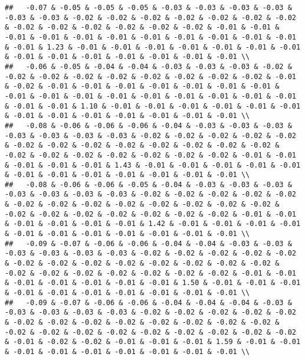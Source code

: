 \documentclass[
]{article}
\begin{document}
\begin{verbatim}
##   -0.07 & -0.05 & -0.05 & -0.05 & -0.03 & -0.03 & -0.03 & -0.03 & -0.03 & -0.03 & -0.02 & -0.02 & -0.02 & -0.02 & -0.02 & -0.02 & -0.02 & -0.02 & -0.02 & -0.02 & -0.02 & -0.02 & -0.02 & -0.01 & -0.01 & -0.01 & -0.01 & -0.01 & -0.01 & -0.01 & -0.01 & -0.01 & -0.01 & -0.01 & -0.01 & 1.23 & -0.01 & -0.01 & -0.01 & -0.01 & -0.01 & -0.01 & -0.01 & -0.01 & -0.01 & -0.01 & -0.01 & -0.01 & -0.01 & -0.01 \\ 
##   -0.06 & -0.05 & -0.04 & -0.04 & -0.03 & -0.03 & -0.03 & -0.02 & -0.02 & -0.02 & -0.02 & -0.02 & -0.02 & -0.02 & -0.02 & -0.02 & -0.01 & -0.02 & -0.01 & -0.01 & -0.01 & -0.01 & -0.01 & -0.01 & -0.01 & -0.01 & -0.01 & -0.01 & -0.01 & -0.01 & -0.01 & -0.01 & -0.01 & -0.01 & -0.01 & -0.01 & 1.10 & -0.01 & -0.01 & -0.01 & -0.01 & -0.01 & -0.01 & -0.01 & -0.01 & -0.01 & -0.01 & -0.01 & -0.01 & -0.01 \\ 
##   -0.08 & -0.06 & -0.06 & -0.06 & -0.04 & -0.03 & -0.03 & -0.03 & -0.03 & -0.03 & -0.03 & -0.03 & -0.02 & -0.02 & -0.02 & -0.02 & -0.02 & -0.02 & -0.02 & -0.02 & -0.02 & -0.02 & -0.02 & -0.02 & -0.02 & -0.02 & -0.02 & -0.02 & -0.02 & -0.02 & -0.02 & -0.02 & -0.01 & -0.01 & -0.01 & -0.01 & -0.01 & 1.43 & -0.01 & -0.01 & -0.01 & -0.01 & -0.01 & -0.01 & -0.01 & -0.01 & -0.01 & -0.01 & -0.01 & -0.01 \\ 
##   -0.08 & -0.06 & -0.06 & -0.05 & -0.04 & -0.03 & -0.03 & -0.03 & -0.03 & -0.03 & -0.03 & -0.03 & -0.02 & -0.02 & -0.02 & -0.02 & -0.02 & -0.02 & -0.02 & -0.02 & -0.02 & -0.02 & -0.02 & -0.02 & -0.02 & -0.02 & -0.02 & -0.02 & -0.02 & -0.02 & -0.02 & -0.02 & -0.01 & -0.01 & -0.01 & -0.01 & -0.01 & -0.01 & 1.42 & -0.01 & -0.01 & -0.01 & -0.01 & -0.01 & -0.01 & -0.01 & -0.01 & -0.01 & -0.01 & -0.01 \\ 
##   -0.09 & -0.07 & -0.06 & -0.06 & -0.04 & -0.04 & -0.03 & -0.03 & -0.03 & -0.03 & -0.03 & -0.03 & -0.02 & -0.02 & -0.02 & -0.02 & -0.02 & -0.02 & -0.02 & -0.02 & -0.02 & -0.02 & -0.02 & -0.02 & -0.02 & -0.02 & -0.02 & -0.02 & -0.02 & -0.02 & -0.02 & -0.02 & -0.01 & -0.01 & -0.01 & -0.01 & -0.01 & -0.01 & -0.01 & 1.50 & -0.01 & -0.01 & -0.01 & -0.01 & -0.01 & -0.01 & -0.01 & -0.01 & -0.01 & -0.01 \\ 
##   -0.09 & -0.07 & -0.06 & -0.06 & -0.04 & -0.04 & -0.04 & -0.03 & -0.03 & -0.03 & -0.03 & -0.03 & -0.02 & -0.02 & -0.02 & -0.02 & -0.02 & -0.02 & -0.02 & -0.02 & -0.02 & -0.02 & -0.02 & -0.02 & -0.02 & -0.02 & -0.02 & -0.02 & -0.02 & -0.02 & -0.02 & -0.02 & -0.02 & -0.02 & -0.01 & -0.02 & -0.02 & -0.01 & -0.01 & -0.01 & 1.59 & -0.01 & -0.01 & -0.01 & -0.01 & -0.01 & -0.01 & -0.01 & -0.01 & -0.01 \\ 

\end{verbatim}
\end{document}
